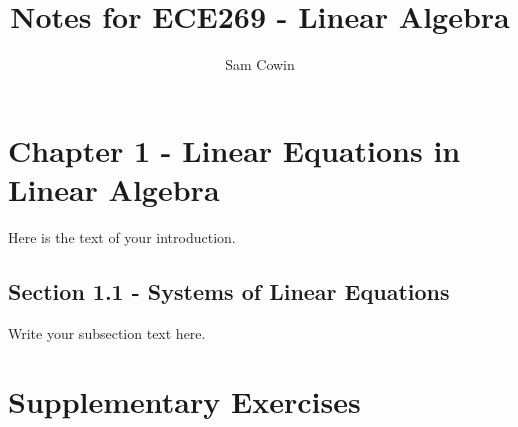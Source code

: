 \documentclass[12pt]{article}
\begin{document}
\title{Notes for ECE269 - Linear Algebra}
\author{Sam Cowin}

\maketitle

\section{Chapter 1 - Linear Equations in Linear Algebra}
Here is the text of your introduction.

\subsection{Section 1.1 - Systems of Linear Equations}
Write your subsection text here.

\section{Supplementary Exercises}
\end{document}
